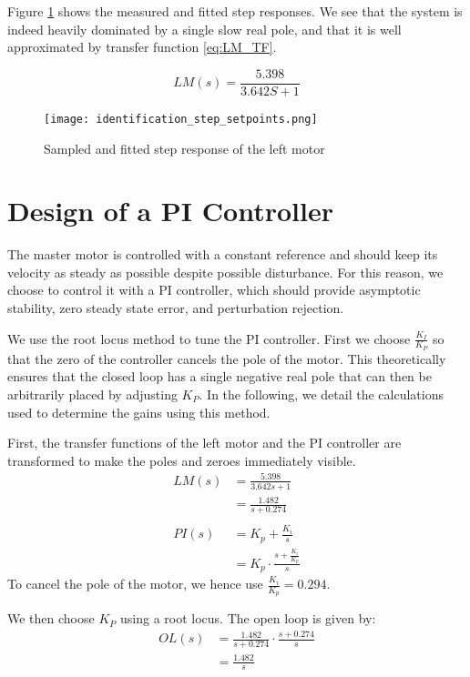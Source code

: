 Figure \ref{fig:LM_id} shows the measured and fitted step responses. We see that the system is indeed heavily dominated by a single slow real pole, and that it is well approximated by transfer function \ref{eq:LM_TF}.

\begin{equation}
	LM(s) = \frac{5.398}{3.642S+1}
  \label{eq:LM_TF}
\end{equation}

\begin{figure}[htbp]
\centering
\texttt{[image: identification\_step\_setpoints.png]}
\caption{Sampled and fitted step response of the left motor\label{fig:LM_id}}
\end{figure}

\section{Design of a PI Controller}
The master motor is controlled with a constant reference and should keep its velocity as steady as possible despite possible disturbance. For this reason, we choose to control it with a PI controller, which should provide asymptotic stability, zero steady state error, and perturbation rejection.

We use the root locus method to tune the PI controller. First we choose $\frac{K_I}{K_P}$ so that the zero of the controller cancels the pole of the motor. This theoretically ensures that the closed loop has a single negative real pole that can then be arbitrarily placed by adjusting $K_P$. In the following, we detail the calculations used to determine the gains using this method.

First, the transfer functions of the left motor and the PI controller are transformed to make the poles and zeroes immediately visible.
\begin{align*}
	LM(s) &= \frac{5.398}{3.642s+1}\\
				&= \frac{1.482}{s+0.274}\\
\\PI(s) &= K_p + \frac{K_i}{s}\\
    		&= K_p \cdot \frac{s+\frac{K_i}{K_p}}{s}
\end{align*}
To cancel the pole of the motor, we hence use $\frac{K_i}{K_p} = 0.294$.

We then choose $K_P$ using a root locus. The open loop is given by:
\begin{align*}
    OL(s) &= \frac{1.482}{s+0.274} \cdot \frac{s+0.274}{s} \\
					&= \frac{1.482}{s}
\end{align*}

